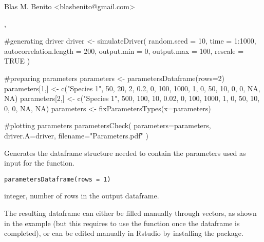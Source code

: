 \documentclass[letterpaper]{book}
\begin{document}
%
\begin{Author}\relax
Blas M. Benito  <blasbenito@gmail.com>
\end{Author}
%
\begin{SeeAlso}\relax
{}, 
\end{SeeAlso}
%
\begin{Examples}
\begin{ExampleCode}
#generating driver
driver <- simulateDriver(
 random.seed = 10,
 time = 1:1000,
 autocorrelation.length = 200,
 output.min = 0,
 output.max = 100,
 rescale = TRUE
 )

#preparing parameters
parameters <- parametersDataframe(rows=2)
parameters[1,] <- c("Species 1", 50, 20, 2, 0.2, 0, 100, 1000, 1, 0, 50, 10, 0, 0, NA, NA)
parameters[2,] <- c("Species 1", 500, 100, 10, 0.02, 0, 100, 1000, 1, 0, 50, 10, 0, 0, NA, NA)
parameters <- fixParametersTypes(x=parameters)

#plotting parameters
parametersCheck(
 parameters=parameters,
 driver.A=driver,
 filename="Parameters.pdf"
 )

\end{ExampleCode}
\end{Examples}
%
\begin{Description}\relax
Generates the dataframe structure needed to contain the parameters used as input for the  function.
\end{Description}
%
\begin{Usage}
\begin{verbatim}
parametersDataframe(rows = 1)
\end{verbatim}
\end{Usage}
%
\begin{Arguments}
\begin{ldescription}
\item[\code{rows}] integer, number of rows in the output dataframe.
\end{ldescription}
\end{Arguments}
%
\begin{Details}\relax
The resulting dataframe can either be filled manually through vectors, as shown in the example (but this requires to use the function  once the dataframe is completed), or can be edited manually in Rstudio by installing the  package.
\end{Details}
\end{document}
